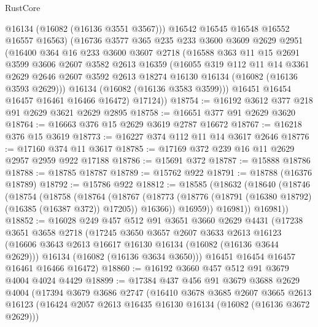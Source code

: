 \begin{lexlean}{RustCore}
\begin{coremodule}
          @16134
          (@16082 (@16136 @3551 @3567)))
        @16542
        @16545
        @16548
        @16552
        @16557
        @16563)
      (@16736
        @3577
        @365
        @235
        @233
        @3600
        @3609
        @2629
        @2951
        (@16400
          @364
          @16
          @233
          @3600
          @3607
          @2718
          (@16588
            @363
            @11
            @15
            @2691
            @3599
            @3606
            @2607
            @3582
            @2613
            @16359
            (@16055
              @319
              @112
              @11
              @14
              @3361
              @2629
              @2646
              @2607
              @3592
              @2613
              @18274
              @16130
              @16134
              (@16082 (@16136 @3593 @2629)))
            @16134
            (@16082 (@16136 @3583 @3599)))
          @16451
          @16454
          @16457
          @16461
          @16466
          @16472)
        @17124))
@18754 := @16192 @3612 @377 @218 @91 @2629 @3621 @2629 @2895
@18758 := @16651 @377 @91 @2629 @3620
@18764 := @16663 @376 @15 @2629 @3619 @2787 @16672
@18767 := @16218 @376 @15 @3619
@18773 := @16227 @374 @112 @11 @14 @3617 @2646
@18776 := @17160 @374 @11 @3617
@18785 := @17169 @372 @239 @16 @11 @2629 @2957 @2959 @922 @17188
@18786 := @15691 @372
@18787 := @15888 @18786
@18788 := @18785 @18787
@18789 := @15762 @922
@18791 := @18788 (@16376 @18789)
@18792 := @15786 @922
@18812 := @18585
    (@18632
      (@18640
        (@18746
          (@18754
            (@18758
              (@18764
                (@18767
                  (@18773 (@18776 (@18791 (@16380 @18792) (@16385 (@16387 @372)) @17205)) @16366))
                @16959))
            @16981))
        @16981))
@18852 := @16028
    @249
    @457
    @512
    @91
    @3651
    @3660
    @2629
    @4431
    (@17238
      @3651
      @3658
      @2718
      (@17245
        @3650
        @3657
        @2607
        @3633
        @2613
        @16123
        (@16606 @3643 @2613 @16617 @16130 @16134 (@16082 (@16136 @3644 @2629)))
        @16134
        (@16082 (@16136 @3634 @3650)))
      @16451
      @16454
      @16457
      @16461
      @16466
      @16472)
@18860 := @16192 @3660 @457 @512 @91 @3679 @4004 @4024 @4429
@18899 := @17384
    @437
    @456
    @91
    @3679
    @3688
    @2629
    @4004
    (@17394
      @3679
      @3686
      @2747
      (@16410
        @3678
        @3685
        @2607
        @3665
        @2613
        @16123
        (@16424 @2057 @2613 @16435 @16130 @16134 (@16082 (@16136 @3672 @2629)))

\end{coremodule}
\end{lexlean}
